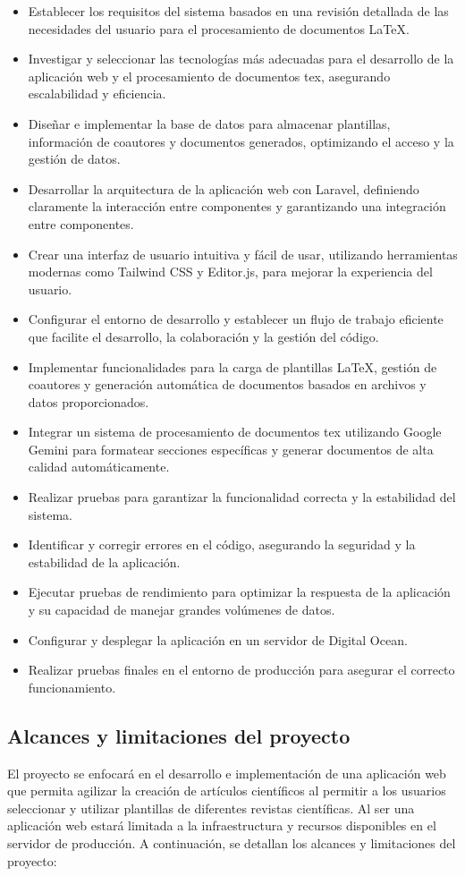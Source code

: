 \begin{itemize}
    \item Establecer los requisitos del sistema basados en una revisión detallada de las necesidades del usuario para el procesamiento de documentos LaTeX.
    \item Investigar y seleccionar las tecnologías más adecuadas para el desarrollo de la aplicación web y el procesamiento de documentos tex, asegurando escalabilidad y eficiencia.
    \item Diseñar e implementar la base de datos para almacenar plantillas, información de coautores y documentos generados, optimizando el acceso y la gestión de datos.
    \item Desarrollar la arquitectura de la aplicación web con Laravel, definiendo claramente la interacción entre componentes y garantizando una integración entre componentes.
    \item Crear una interfaz de usuario intuitiva y fácil de usar, utilizando herramientas modernas como Tailwind CSS y Editor.js, para mejorar la experiencia del usuario.
    \item Configurar el entorno de desarrollo y establecer un flujo de trabajo eficiente que facilite el desarrollo, la colaboración y la gestión del código.
    \item Implementar funcionalidades para la carga de plantillas LaTeX, gestión de coautores y generación automática de documentos basados en archivos y datos proporcionados.
    \item Integrar un sistema de procesamiento de documentos tex utilizando Google Gemini para formatear secciones específicas y generar documentos de alta calidad automáticamente.
    \item Realizar pruebas para garantizar la funcionalidad correcta y la estabilidad del sistema.
    \item Identificar y corregir errores en el código, asegurando la seguridad y la estabilidad de la aplicación.
    \item Ejecutar pruebas de rendimiento para optimizar la respuesta de la aplicación y su capacidad de manejar grandes volúmenes de datos.
    \item Configurar y desplegar la aplicación en un servidor de Digital Ocean.
    \item Realizar pruebas finales en el entorno de producción para asegurar el correcto funcionamiento.
\end{itemize}


\subsection{Alcances y limitaciones del proyecto}
El proyecto se enfocará en el desarrollo e implementación de una aplicación web que permita agilizar la creación de artículos científicos al permitir a los usuarios seleccionar y utilizar plantillas de diferentes revistas científicas. Al ser una aplicación web estará limitada a la infraestructura y recursos disponibles en el servidor de producción. A continuación, se detallan los alcances y limitaciones del proyecto:


